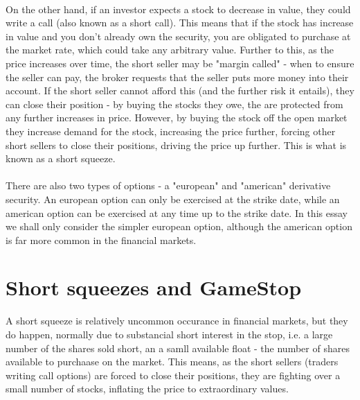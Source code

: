 \documentclass[11pt]{article} %
\begin{document}
\paragraph{}
On the other hand, if an investor expects a stock to decrease 
in value, they could write a call (also known as a short call). This 
means that if the stock has increase in value and you don't already own 
the security, you are obligated to purchase at the market rate, which 
could take any arbitrary value. Further to this, as the price increases 
over time, the short seller may be "margin called" - when to ensure the 
seller can pay, the broker requests that the seller puts more money into 
their account. If the short seller cannot afford this (and the further 
risk it entails), they can close their position - by buying the stocks 
they owe, the are protected from any further increases in price. However, 
by buying the stock off the open market they increase demand for the 
stock, increasing the price further, forcing other short sellers to 
close their positions, driving the price up further. This is what is 
known as a short squeeze.
\paragraph{}\label{typesofoption}
There are also two types of options - a "european" and "american" 
derivative security. An european option can only be exercised at the 
strike date, while an american option can be exercised at any time up 
to the strike date. In this essay we shall only consider the simpler 
european option, although the american option is far more common in 
the financial markets.

\section{Short squeezes and GameStop}
A short squeeze is relatively uncommon occurance in financial markets, but they do 
happen, normally due to substancial short interest in the stop, i.e. a large number 
of the shares sold short, an a samll available float - the number of shares 
available to purchaase on the market. This means, as the short sellers (traders 
writing call options) are forced to close their positions, they are fighting over 
a small number of stocks, inflating the price to extraordinary values. 
\end{document}
